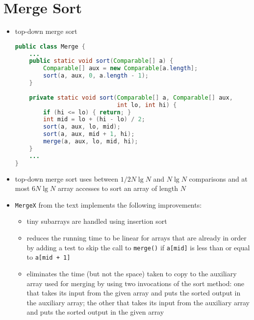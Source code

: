 \documentclass[8pt,a4paper,compress]{beamer}
\begin{document}
\section{Merge Sort}
\begin{frame}[fragile]
\begin{itemize}
\item top-down merge sort
\begin{lstlisting}[language=Java]
public class Merge {
    ...
    public static void sort(Comparable[] a) {
        Comparable[] aux = new Comparable[a.length]; 
        sort(a, aux, 0, a.length - 1);
    }
    
    private static void sort(Comparable[] a, Comparable[] aux, 
                             int lo, int hi) {
        if (hi <= lo) { return; }
        int mid = lo + (hi - lo) / 2;
        sort(a, aux, lo, mid); 
        sort(a, aux, mid + 1, hi); 
        merge(a, aux, lo, mid, hi);
    }
    ...
}
\end{lstlisting}
\end{itemize}
\end{frame}

\begin{frame}[fragile]
\begin{itemize}
\item trace
\begin{center}
\texttt{[image: \{./figures/mergetd\_trace]}.pdf}

\smallskip

top-down merge sort
\end{center}
\end{itemize}
\end{frame}

\begin{frame}[fragile]
\begin{itemize}
\item top-down merge sort uses between $1/2N\lg N$ and $N\lg N$ comparisons and at most $6N\lg N$ array accesses to sort an array of length $N$

\item \lstinline$MergeX$ from the text implements the following improvements:

\begin{itemize}
\item tiny subarrays are handled using insertion sort

\item reduces the running time to be linear for arrays that are already in order by adding a test to skip the call to \lstinline$merge()$ if \lstinline$a[mid]$ is less than or equal to \lstinline$a[mid + 1]$

\item eliminates the time (but not the space) taken to copy to the auxiliary array used for merging by using two invocations of the sort method: one that takes its input from the given array and puts the sorted output in the auxiliary array; the other that takes its input from the auxiliary array and puts the sorted output in the given array
\end{itemize}
\end{itemize}
\end{frame}
\end{document}
